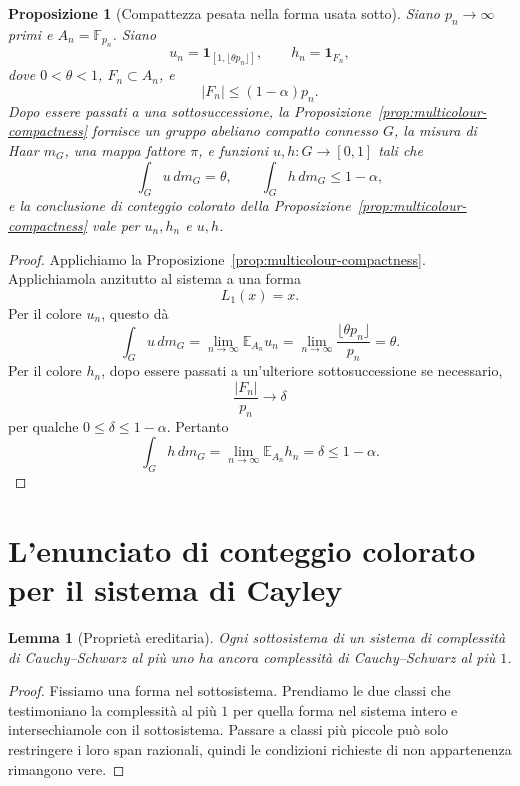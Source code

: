 \documentclass[11pt]{article}
\numberwithin{equation}{section}
\newtheorem{lemma}[theorem]{Lemma}
\newtheorem{proposition}[theorem]{Proposizione}
\newcommand{\E}{\mathbb E}
\newcommand{\F}{\mathbb F}
\newcommand{\1}{\mathbf 1}
\begin{document}
\begin{proposition}[Compattezza pesata nella forma usata sotto]
\label{prop:weighted-compactness}
Siano \(p_n\to\infty\) primi e \(A_n=\F_{p_n}\). Siano
\[
        u_n=\1_{[1,\lfloor\theta p_n\rfloor]},
        \qquad
        h_n=\1_{F_n},
\]
dove \(0<\theta<1\), \(F_n\subset A_n\), e
\[
        |F_n|\le(1-\alpha)p_n.
\]
Dopo essere passati a una sottosuccessione, la Proposizione~\ref{prop:multicolour-compactness} fornisce un gruppo abeliano compatto connesso \(G\), la misura di Haar \(m_G\), una mappa fattore \(\pi\), e funzioni \(u,h:G\to[0,1]\) tali che
\[
        \int_G u\,dm_G=\theta,
        \qquad
        \int_G h\,dm_G\le1-\alpha,
\]
e la conclusione di conteggio colorato della Proposizione~\ref{prop:multicolour-compactness} vale per \(u_n,h_n\) e \(u,h\).
\end{proposition}

\begin{proof}
Applichiamo la Proposizione~\ref{prop:multicolour-compactness}. Applichiamola anzitutto al sistema a una forma
\[
        L_1(x)=x.
\]
Per il colore \(u_n\), questo dà
\[
        \int_G u\,dm_G
        =
        \lim_{n\to\infty}\E_{A_n}u_n
        =
        \lim_{n\to\infty}\frac{\lfloor\theta p_n\rfloor}{p_n}
        =
        \theta.
\]
Per il colore \(h_n\), dopo essere passati a un'ulteriore sottosuccessione se necessario,
\[
        \frac{|F_n|}{p_n}\to\delta
\]
per qualche \(0\le\delta\le1-\alpha\). Pertanto
\[
        \int_G h\,dm_G
        =
        \lim_{n\to\infty}\E_{A_n}h_n
        =
        \delta
        \le1-\alpha.
\]
\end{proof}

\section{L'enunciato di conteggio colorato per il sistema di Cayley}
\label{sec:cayley-counting}

\begin{lemma}[Proprietà ereditaria]
\label{lem:cs-hereditary}
Ogni sottosistema di un sistema di complessità di Cauchy--Schwarz al più uno ha ancora complessità di Cauchy--Schwarz al più \(1\).
\end{lemma}

\begin{proof}
Fissiamo una forma nel sottosistema. Prendiamo le due classi che testimoniano la complessità al più \(1\) per quella forma nel sistema intero e intersechiamole con il sottosistema. Passare a classi più piccole può solo restringere i loro span razionali, quindi le condizioni richieste di non appartenenza rimangono vere.
\end{proof}
\end{document}
